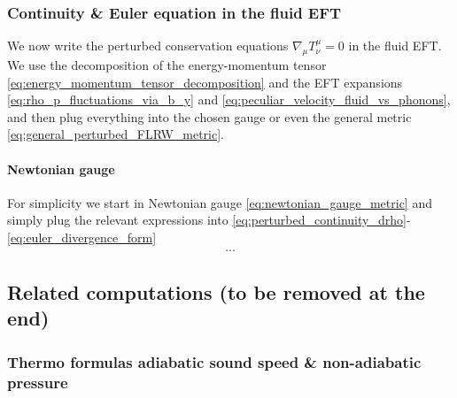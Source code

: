 \subsubsection{Continuity \& Euler equation in the fluid EFT}
%
We now write the perturbed conservation equations $\nabla_\mu T^{\mu}_\nu=0$ in the fluid EFT.
We use the decomposition of the energy-momentum tensor \eqref{eq:energy_momentum_tensor_decomposition} and the EFT expansions \eqref{eq:rho_p_fluctuations_via_b_y} and \eqref{eq:peculiar_velocity_fluid_vs_phonons}, and then plug everything into the chosen gauge or even the general metric \eqref{eq:general_perturbed_FLRW_metric}.

\paragraph{Newtonian gauge}
For simplicity we start in Newtonian gauge \eqref{eq:newtonian_gauge_metric} and simply plug the relevant expressions into \eqref{eq:perturbed_continuity_drho}-\eqref{eq:euler_divergence_form}
\begin{align}
    ...
\end{align}



%



\newpage
\subsection{Related computations (to be removed at the end)}


\subsubsection{Thermo formulas adiabatic sound speed \& non-adiabatic pressure}

